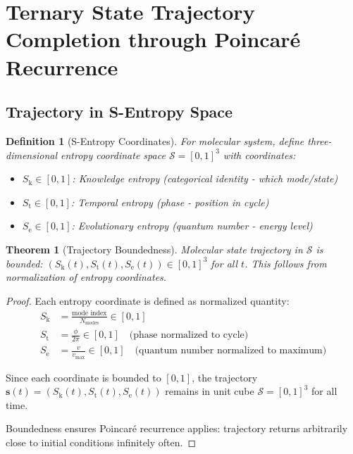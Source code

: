 \documentclass[twocolumn,10pt]{article}
\newtheorem{theorem}{Theorem}[section]
\newtheorem{definition}{Definition}[section]
\newcommand{\Sk}{S_{\text{k}}}
\newcommand{\St}{S_{\text{t}}}
\newcommand{\Se}{S_{\text{e}}}
\newcommand{\Sspace}{\mathcal{S}}
\begin{document}
\section{Ternary State Trajectory Completion through Poincar\'e Recurrence}

\subsection{Trajectory in S-Entropy Space}

\begin{definition}[S-Entropy Coordinates]
For molecular system, define three-dimensional entropy coordinate space $\Sspace = [0,1]^3$ with coordinates:
\begin{itemize}
\item $\Sk \in [0,1]$: Knowledge entropy (categorical identity - which mode/state)
\item $\St \in [0,1]$: Temporal entropy (phase - position in cycle)
\item $\Se \in [0,1]$: Evolutionary entropy (quantum number - energy level)
\end{itemize}
\end{definition}

\begin{theorem}[Trajectory Boundedness]
\label{thm:trajectory_bounded}
Molecular state trajectory in $\Sspace$ is bounded: $(\Sk(t), \St(t), \Se(t)) \in [0,1]^3$ for all $t$. This follows from normalization of entropy coordinates.
\end{theorem}

\begin{proof}
Each entropy coordinate is defined as normalized quantity:
\begin{align}
\Sk &= \frac{\text{mode index}}{N_{\text{modes}}} \in [0,1] \\
\St &= \frac{\phi}{2\pi} \in [0,1] \quad \text{(phase normalized to cycle)} \\
\Se &= \frac{v}{v_{\max}} \in [0,1] \quad \text{(quantum number normalized to maximum)}
\end{align}

Since each coordinate is bounded to $[0,1]$, the trajectory $\mathbf{s}(t) = (\Sk(t), \St(t), \Se(t))$ remains in unit cube $\Sspace = [0,1]^3$ for all time.

Boundedness ensures Poincar\'e recurrence applies: trajectory returns arbitrarily close to initial conditions infinitely often.
\end{proof}
\end{document}
